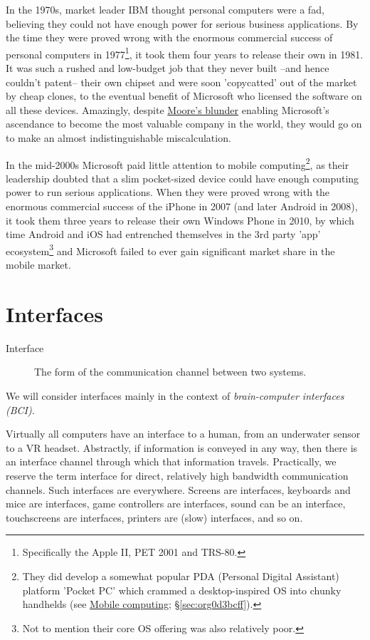 \documentclass[logo,bsc,singlespacing,parskip]{infthesis}
\begin{document}
In the 1970s, market leader IBM thought personal computers were a fad, believing they could not have enough power for serious business applications.
By the time they were proved wrong with the enormous commercial success of personal computers in 1977\footnote{Specifically the Apple II, PET 2001 and TRS-80.}, it took them four years to release their own in 1981. It was such a rushed and low-budget job that they never built --and hence couldn't patent-- their own chipset and were soon 'copycatted' out of the market by cheap clones, to the eventual benefit of Microsoft who licensed the software on all these devices.
Amazingly, despite \hyperref[org4e0f6c1]{Moore's blunder} enabling Microsoft's ascendance to become the most valuable company in the world, they would go on to make an almost indistinguishable miscalculation.

In the mid-2000s Microsoft paid little attention to mobile computing\footnote{They did develop a somewhat popular PDA (Personal Digital Assistant) platform 'Pocket PC' which crammed a desktop-inspired OS into chunky handhelds (see \hyperref[sec:org0d3bcff]{Mobile computing}; \S \ref{sec:org0d3bcff}).}, as their leadership doubted that a slim pocket-sized device could have enough computing power to run serious applications.
When they were proved wrong with the enormous commercial success of the iPhone in 2007 (and later Android in 2008), it took them three years to release their own Windows Phone in 2010, by which time Android and iOS had entrenched themselves in the 3rd party 'app' ecosystem\footnote{Not to mention their core OS offering was also relatively poor.} and Microsoft failed to ever gain significant market share in the mobile market.

\chapter{Interfaces}
\label{sec:org020dbaa}
\begin{mdframed}
\begin{description}
\item[{Interface\label{Interface}}] The form of the communication channel between two systems.
\end{description}
\end{mdframed}

We will consider interfaces mainly in the context of \emph{brain-computer interfaces (BCI)}.

Virtually all computers have an interface to a human, from an underwater sensor to a VR headset.
Abstractly, if information is conveyed in any way, then there is an interface channel through which that information travels.
Practically, we reserve the term interface for direct, relatively high bandwidth communication channels.
Such interfaces are everywhere.
Screens are interfaces, keyboards and mice are interfaces, game controllers are interfaces, sound can be an interface, touchscreens are interfaces, printers are (slow) interfaces, and so on.
\end{document}
